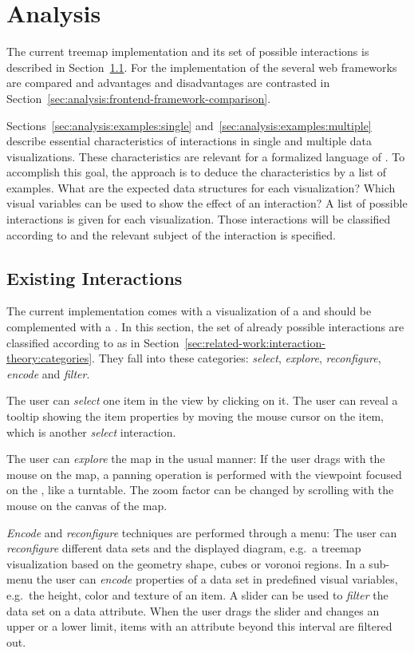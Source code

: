 \chapter{Analysis}\label{sec:analysis}
The current treemap implementation and its set of possible interactions is described in Section~\ref{sec:analysis:existing-interactions}.
For the implementation of the \gv{} several web frameworks are compared and advantages and disadvantages are contrasted in Section~\ref{sec:analysis:frontend-framework-comparison}.

Sections~\ref{sec:analysis:examples:single} and~\ref{sec:analysis:examples:multiple} describe essential characteristics of interactions in single and multiple data visualizations.
These characteristics are relevant for a formalized language of \cmvs{}.
To accomplish this goal, the approach is to deduce the characteristics by a list of examples.
What are the expected data structures for each visualization?
Which visual variables can be used to show the effect of an interaction?
A list of possible interactions is given for each visualization.
Those interactions will be classified according to \textcite{Yi2007} and the relevant subject of the interaction is specified.



\section{Existing Interactions}\label{sec:analysis:existing-interactions}
The current implementation comes with a visualization of a \tmap{} and should be complemented with a \gv{}.
In this section, the set of already possible interactions are classified according to \textcite{Yi2007} as in Section~\ref{sec:related-work:interaction-theory:categories}.
They fall into these categories: \emph{select}, \emph{explore}, \emph{reconfigure}, \emph{encode} and \emph{filter}.

The user can \emph{select} one item in the view by clicking on it.
The user can reveal a tooltip showing the item properties by moving the mouse cursor on the item, which is another \emph{select} interaction.

The user can \emph{explore} the map in the usual manner:
If the user drags with the mouse on the map, a panning operation is performed with the viewpoint focused on the \tmap{}, like a turntable.
The zoom factor can be changed by scrolling with the mouse on the canvas of the map.

\emph{Encode} and \emph{reconfigure} techniques are performed through a menu:
The user can \emph{reconfigure} different data sets and the displayed diagram, e.g.\ a treemap visualization based on the geometry shape, cubes or voronoi regions.
In a sub-menu the user can \emph{encode} properties of a data set in predefined visual variables, e.g.\ the height, color and texture of an item.
A slider can be used to \emph{filter} the data set on a data attribute.
When the user drags the slider and changes an upper or a lower limit, items with an attribute beyond this interval are filtered out.



